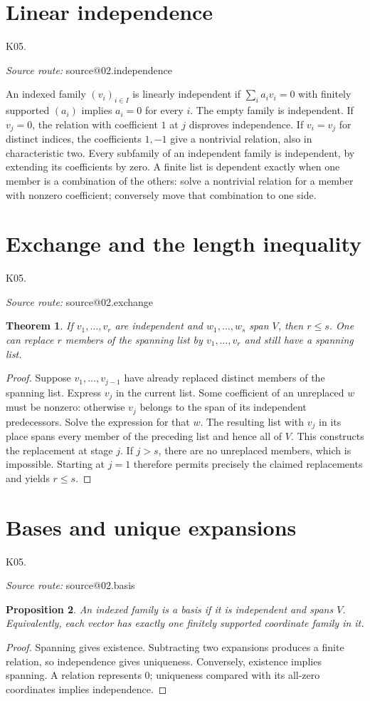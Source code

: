 \documentclass[11pt,a4paper]{book}
\makeatletter
\newtheorem{theorem}{Theorem}[chapter]
\newtheorem{proposition}[theorem]{Proposition}
\theoremstyle{definition}\newtheorem{definition}[theorem]{Definition}
\theoremstyle{remark}\newtheorem{remark}[theorem]{Remark}
\newcommand{\Kentry}[2]{\section{#2}\label{k:#1}\noindent\textsf{\small K05.\detokenize{#1}}\par
  \begingroup\small\color{black!65}\textit{Source route: }\csname source@#1\endcsname\par\endgroup}
\makeatother
\begin{document}
\Kentry{02.independence}{Linear independence}
An indexed family $(v_i)_{i\in I}$ is linearly independent if $\sum_i a_i v_i=0$ with finitely supported $(a_i)$ implies $a_i=0$ for every $i$. The empty family is independent. If $v_j=0$, the relation with coefficient $1$ at $j$ disproves independence. If $v_i=v_j$ for distinct indices, the coefficients $1,-1$ give a nontrivial relation, also in characteristic two. Every subfamily of an independent family is independent, by extending its coefficients by zero. A finite list is dependent exactly when one member is a combination of the others: solve a nontrivial relation for a member with nonzero coefficient; conversely move that combination to one side.

\Kentry{02.exchange}{Exchange and the length inequality}
\begin{theorem}
If $v_1,\ldots,v_r$ are independent and $w_1,\ldots,w_s$ span $V$, then $r\le s$. One can replace $r$ members of the spanning list by $v_1,\ldots,v_r$ and still have a spanning list.
\end{theorem}
\begin{proof}
Suppose $v_1,\ldots,v_{j-1}$ have already replaced distinct members of the spanning list. Express $v_j$ in the current list. Some coefficient of an unreplaced $w$ must be nonzero: otherwise $v_j$ belongs to the span of its independent predecessors. Solve the expression for that $w$. The resulting list with $v_j$ in its place spans every member of the preceding list and hence all of $V$. This constructs the replacement at stage $j$. If $j>s$, there are no unreplaced members, which is impossible. Starting at $j=1$ therefore permits precisely the claimed replacements and yields $r\le s$.
\end{proof}

\Kentry{02.basis}{Bases and unique expansions}
\begin{proposition}
An indexed family is a basis if it is independent and spans $V$. Equivalently, each vector has exactly one finitely supported coordinate family in it.
\end{proposition}
\begin{proof}
Spanning gives existence. Subtracting two expansions produces a finite relation, so independence gives uniqueness. Conversely, existence implies spanning. A relation represents $0$; uniqueness compared with its all-zero coordinates implies independence.
\end{proof}
\end{document}
